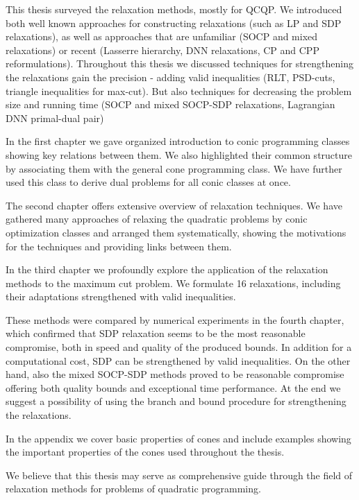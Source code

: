 \documentclass[12pt]{book}
\theoremstyle{definition}
\begin{document}
This thesis surveyed the relaxation methods, mostly for QCQP. We introduced both well known approaches for constructing relaxations (such as LP and SDP relaxations), as well as approaches that are unfamiliar (SOCP and mixed relaxations) or recent (Lasserre hierarchy, DNN relaxations, CP and CPP reformulations). Throughout this thesis we discussed techniques for strengthening the relaxations gain the precision - adding valid inequalities (RLT, PSD-cuts, triangle inequalities for max-cut). But also techniques for decreasing the problem size and running time (SOCP and mixed SOCP-SDP relaxations, Lagrangian DNN primal-dual pair)

In the first chapter we gave organized introduction to conic programming classes showing key relations between them. We also highlighted their common structure by associating them with the general cone programming class. We have further used this class to derive dual problems for all conic classes at once.  

The second chapter offers extensive overview of relaxation techniques. We have gathered many approaches of relaxing the quadratic problems by conic optimization classes and arranged them systematically, showing the motivations for the techniques and providing links between them. 

In the third chapter we profoundly explore the application of the relaxation methods to the maximum cut problem. We formulate 16 relaxations, including their adaptations strengthened with valid inequalities.

These methods were compared by numerical experiments in the fourth chapter, which confirmed that SDP relaxation seems to be the most reasonable compromise, both in speed and quality of the produced bounds. In addition for a computational cost, SDP can be strengthened by valid inequalities. On the other hand, also the mixed SOCP-SDP methods proved to be reasonable compromise offering both quality bounds and exceptional time performance. 
At the end we suggest a possibility of using the branch and bound procedure for strengthening the relaxations. 

In the appendix we cover basic properties of cones and include examples showing the important properties of the cones used throughout the thesis. 

We believe that this thesis may serve as comprehensive guide through the field of relaxation methods for problems of quadratic programming.

 
\end{document}
